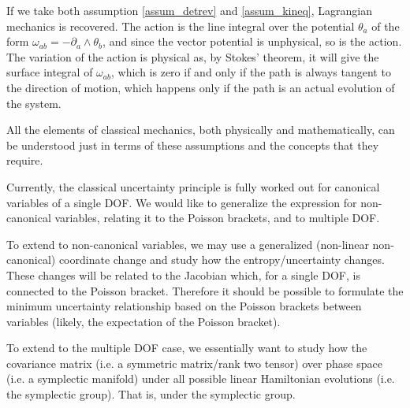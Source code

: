 If we take both assumption \ref{assum_detrev} and \ref{assum_kineq}, Lagrangian mechanics is recovered. The action is the line integral over the potential $\theta_a$ of the form $\omega_{ab} = - \partial_a \wedge \theta_b$, and since the vector potential is unphysical, so is the action. The variation of the action is physical as, by Stokes' theorem, it will give the surface integral of $\omega_{ab}$, which is zero if and only if the path is always tangent to the direction of motion, which happens only if the path is an actual evolution of the system.

All the elements of classical mechanics, both physically and mathematically, can be understood just in terms of these assumptions and the concepts that they require.


\ifdraft

\openproblembreak

{Currently, the classical uncertainty principle is fully worked out for canonical variables of a single DOF. We would like to generalize the expression for non-canonical variables, relating it to the Poisson brackets, and to multiple DOF.}

To extend to non-canonical variables, we may use a generalized (non-linear non-canonical) coordinate change and study how the entropy/uncertainty changes. These changes will be related to the Jacobian which, for a single DOF, is connected to the Poisson bracket. Therefore it should be possible to formulate the minimum uncertainty relationship based on the Poisson brackets between variables (likely, the expectation of the Poisson bracket).

To extend to the multiple DOF case, we essentially want to study how the covariance matrix (i.e. a symmetric matrix/rank two tensor) over phase space (i.e. a symplectic manifold) under all possible linear Hamiltonian evolutions (i.e. the symplectic group). That is, under the symplectic group.

